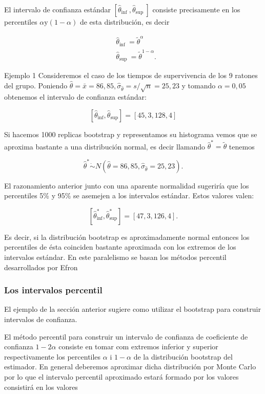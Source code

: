 \documentclass[
]{article}
\begin{document}
El intervalo de confianza estándar \(\left[\hat{\theta}_{\text {inf }}, \hat{\theta}_{\text {sup }}\right]\) consiste precisamente en los percentiles \(\alpha \mathrm{y}(1-\alpha)\) de esta distribución, es decir

\[
\begin{aligned}
& \hat{\theta}_{\text {inf }}=\tilde{\theta}^{\alpha} \\
& \hat{\theta}_{\text {sup }}=\tilde{\theta}^{1-\alpha} .
\end{aligned}
\]

Ejemplo 1 Consideremos el caso de los tiempos de supervivencia de los 9 ratones del grupo. Poniendo \(\hat{\theta}=\bar{x}=86,85, \hat{\sigma}_{\hat{\theta}}=s / \sqrt{n}=25,23\) y tomando \(\alpha=0,05\) obtenemos el intervalo de confianza estándar:

\[
\left[\hat{\theta}_{\mathrm{inf}}, \hat{\theta}_{\mathrm{sup}}\right]=[45,3,128,4]
\]

Si hacemos 1000 replicas bootstrap y representamos su histograma vemos que se aproxima bastante a una distribución normal, es decir llamando \(\hat{\theta}^{*}=\tilde{\theta}\) tenemos

\[
\hat{\theta}^{*} \dot{\sim} N\left(\hat{\theta}=86,85, \hat{\sigma}_{\hat{\theta}}=25,23\right) .
\]

El razonamiento anterior junto con una aparente normalidad sugeriría que los percentiles 5\% y 95\% se asemejen a los intervalos estándar. Estos valores valen:

\[
\left[\hat{\theta}_{\mathrm{inf}}^{*}, \hat{\theta}_{\mathrm{sup}}^{*}\right]=[47,3,126,4] .
\]

Es decir, si la distribución bootstrap es aproximadamente normal entonces los percentiles de ésta coinciden bastante aproximada con los extremos de los intervalos estándar. En este paralelismo se basan los métodos percentil desarrollados por Efron

\subsubsection{Los intervalos percentil}\label{los-intervalos-percentil}

El ejemplo de la sección anterior sugiere como utilizar el bootstrap para construir intervalos de confianza.

El método percentil para construir un intervalo de confianza de coeficiente de confianza \(1-2 \alpha\) consiste en tomar com extremos inferior y superior respectivamente los percentiles \(\alpha\) i \(1-\alpha\) de la distribución bootstrap del estimador. En general deberemos aproximar dicha distribución por Monte Carlo por lo que el intervalo percentil aproximado estará formado por los valores consistirá en los valores
\end{document}
